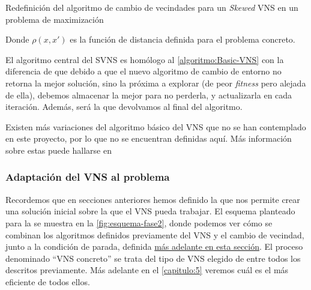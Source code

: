 \begin{algorithm}[h]
    \caption{Redefinición del algoritmo de cambio de vecindades para un \textit{Skewed} VNS en un problema de maximización}
    \label{algoritmo:SVNS-cambio-entornos}

    \DontPrintSemicolon
    \bigskip


\end{algorithm}

Donde $\rho(x,x')$ es la función de distancia definida para el problema concreto.

El algoritmo central del SVNS es homólogo al \autoref{algoritmo:Basic-VNS} con la diferencia de que debido a que el nuevo algoritmo de cambio de entorno no retorna la mejor solución, sino la próxima a explorar (de peor \textit{fitness} pero alejada de ella), debemos almacenar la mejor para no perderla, y actualizarla en cada iteración. Además, será la que devolvamos al final del algoritmo.

Existen más variaciones del algoritmo básico del VNS que no se han contemplado en este proyecto, por lo que no se encuentran definidas aquí. Más información sobre estas puede hallarse en~\cite{vns}

\subsubsection{Adaptación del VNS al problema}
\label{apartado:adaptacion-VNS}

Recordemos que en secciones anteriores hemos definido la \faseuno{} que nos permite crear una solución inicial sobre la que el VNS pueda trabajar. El esquema planteado para la \fasedos{} se muestra en la \autoref{fig:esquema-fase2}, donde podemos ver cómo se combinan los algoritmos definidos previamente del VNS y el cambio de vecindad, junto a la condición de parada, definida \hyperref[apartado:condiciones-parada]{más adelante en esta sección}. El proceso denominado ``VNS concreto'' se trata del tipo de VNS elegido de entre todos los descritos previamente. Más adelante en el \autoref{capitulo:5} veremos cuál es el más eficiente de todos ellos.

